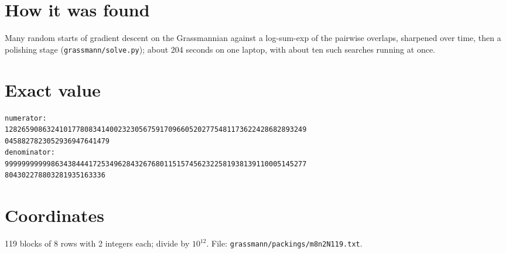 \documentclass[11pt,a4paper]{article}
\begin{document}
\section{How it was found}
Many random starts of gradient descent on the Grassmannian against a log-sum-exp of the pairwise overlaps, sharpened over time, then a polishing stage (\texttt{grassmann/solve.py}); about 204 seconds on one laptop, with about ten such searches running at once.


\appendix
\section{Exact value}
{\small
\begin{verbatim}
numerator:
128265908632410177808341400232305675917096605202775481173622428682893249
0458827823052936947641479
denominator:
999999999998634384441725349628432676801151574562322581938139110005145277
804302278803281935163336
\end{verbatim}}

\section{Coordinates}
119 blocks of 8 rows with 2 integers each; divide by $10^{12}$. File: \texttt{grassmann/packings/m8n2N119.txt}.
{\tiny
\begin{multicols}{4}
\end{multicols}}
\end{document}
